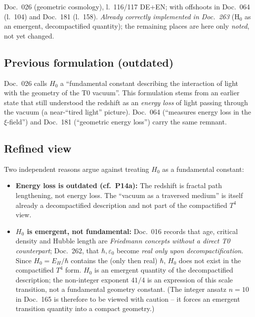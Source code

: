 Doc.~026 (geometric cosmology), l.~116/117 DE+EN; with offshoots in Doc.~064
(l.~104) and Doc.~181 (l.~158). \emph{Already correctly implemented in
Doc.~263} (H$_0$ as an emergent, decompactified quantity); the remaining places
are here only \emph{noted}, not yet changed.

\subsection*{Previous formulation (outdated)}

Doc.~026 calls $H_0$ a \enquote{fundamental constant describing the interaction
of light with the geometry of the T0 vacuum}. This formulation stems from an
earlier state that still understood the redshift as an \emph{energy loss} of
light passing through the vacuum (a near-\enquote{tired light} picture).
Doc.~064 (\enquote{measures energy loss in the $\xi$-field}) and Doc.~181
(\enquote{geometric energy loss}) carry the same remnant.

\subsection*{Refined view}

Two independent reasons argue against treating $H_0$ as a fundamental constant:
\begin{itemize}
  \item \textbf{Energy loss is outdated (cf.\ P14a):} The redshift is fractal
        path lengthening, not energy loss. The \enquote{vacuum as a traversed
        medium} is itself already a decompactified description and not part of
        the compactified $T^4$ view.
  \item \textbf{$H_0$ is emergent, not fundamental:} Doc.~016 records that age,
        critical density and Hubble length are \emph{Friedmann concepts without
        a direct T0 counterpart}; Doc.~262, that $\hbar, \varepsilon_0$ become
        \emph{real only upon decompactification}. Since $H_0 = E_H/\hbar$
        contains the (only then real) $\hbar$, $H_0$ does not exist in the
        compactified $T^4$ form. $H_0$ is an emergent quantity of the
        decompactified description; the non-integer exponent $41/4$ is an
        expression of this scale transition, not a fundamental geometry
        constant. (The integer ansatz $n=10$ in Doc.~165 is therefore to be
        viewed with caution -- it forces an emergent transition quantity into a
        compact geometry.)
\end{itemize}

